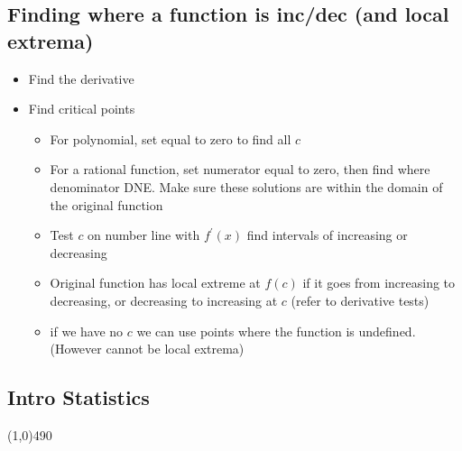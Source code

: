 \documentclass{report}
\begin{document}
      \subsection{Finding where a function is inc/dec (and local extrema)}
      \begin{itemize}
        \item Find the derivative
        \item Find critical points
          \begin{itemize}
            \item For polynomial, set equal to zero to find all $c$
            \item For a rational function, set numerator equal to zero, then find where denominator DNE. Make sure these solutions are within the domain of the original function
            \item Test $c$ on number line with $f^{\prime}(x)$ find intervals of increasing or decreasing
            \item Original function has local extreme at $f(c)$ if it goes from increasing to decreasing, or decreasing to increasing at $c$ (refer to derivative tests)
            \item if we have no $c$ we can use points where the function is undefined. (However cannot be local extrema)
          \end{itemize}
      \end{itemize}

      \pagebreak \bigbreak \noindent
      \begin{center}
        \section{Intro Statistics}
      \end{center}
      \line(1,0){490}
      \bigbreak \noindent 
\end{document}
